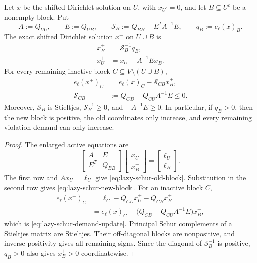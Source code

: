 \begin{lemma}
\label{lem:lazy-block-schur}
Let $x$ be the shifted Dirichlet solution on $U$, with $x_{U^c}=0$, and let
$B\subseteq U^c$ be a nonempty block.  Put
\begin{equation}
 A:=Q_{UU},
 \qquad E:=Q_{UB},
 \qquad
 \mathcal S_B:=Q_{BB}-E^TA^{-1}E,
 \qquad
 q_B:=e_\ell(x)_B.
 \label{eq:lazy-schur-data}
\end{equation}
The exact shifted Dirichlet solution $x^+$ on $U\cup B$ is
\begin{align}
 x_B^+&=\mathcal S_B^{-1}q_B,
 \label{eq:lazy-schur-new-block}\\
 x_U^+&=x_U-A^{-1}Ex_B^+.
 \label{eq:lazy-schur-old-block}
\end{align}
For every remaining inactive block
$C\subseteq V\setminus(U\cup B)$,
\begin{align}
 e_\ell(x^+)_C
 &=e_\ell(x)_C-\mathcal S_{CB}x_B^+,
 \label{eq:lazy-schur-demand-update}\\
 \mathcal S_{CB}
 &:=Q_{CB}-Q_{CU}A^{-1}E\leq0.
 \label{eq:lazy-schur-cross-block}
\end{align}
Moreover, $\mathcal S_B$ is Stieltjes,
$\mathcal S_B^{-1}\geq0$, and $-A^{-1}E\geq0$.  In particular, if
$q_B>0$, then the new block is positive, the old coordinates only increase,
and every remaining violation demand can only increase.
\end{lemma}

\begin{proof}
The enlarged active equations are
\begin{equation*}
 \begin{bmatrix}A&E\\E^T&Q_{BB}\end{bmatrix}
 \begin{bmatrix}x_U^+\\x_B^+\end{bmatrix}
 =
 \begin{bmatrix}\ell_U\\\ell_B\end{bmatrix}.
\end{equation*}
The first row and $Ax_U=\ell_U$ give
\cref{eq:lazy-schur-old-block}.  Substitution in the second row gives
\cref{eq:lazy-schur-new-block}.  For an inactive block $C$,
\begin{align*}
 e_\ell(x^+)_C
 &=\ell_C-Q_{CU}x_U^+-Q_{CB}x_B^+\\
 &=e_\ell(x)_C-
   \bigl(Q_{CB}-Q_{CU}A^{-1}E\bigr)x_B^+,
\end{align*}
which is \cref{eq:lazy-schur-demand-update}.  Principal Schur complements of
a Stieltjes matrix are Stieltjes.  Their off-diagonal blocks are
nonpositive, and inverse positivity gives all remaining signs.  Since the
diagonal of $\mathcal S_B^{-1}$ is positive, $q_B>0$ also gives
$x_B^+>0$ coordinatewise.
\end{proof}

